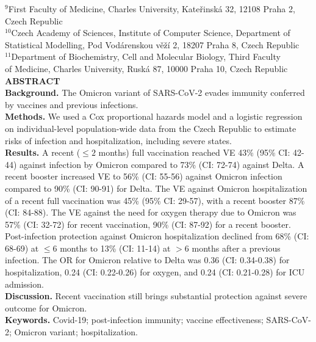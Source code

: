 \documentclass[a4paper,12pt]{article}
\begin{document}
$^9$First Faculty of Medicine, Charles University, Kate\v{r}inská 32, 12108 Praha 2, Czech Republic \\[1ex]
$^{10}$Czech Academy of Sciences, Institute of Computer Science, Department of Statistical Modelling, Pod Vodárenskou věží 2, 18207 Praha 8, Czech Republic \\[1ex]
$^{11}$Department of Biochemistry, Cell and Molecular Biology, Third Faculty \\ of Medicine, Charles University, Ruská 87, 10000 Praha 10, Czech Republic \\[3ex]
\noindent
\vspace{1ex}
\noindent
{\bf ABSTRACT} \\[1ex]
{\bf Background.} The Omicron variant of SARS-CoV-2 evades immunity conferred by vaccines and previous infections. \\
{\bf Methods.} We used a Cox proportional hazards model and a logistic regression on individual-level population-wide data from the Czech Republic to estimate risks of infection and hospitalization, including severe states.\\
{\bf Results.} A recent ($\leq 2$ months) full vaccination reached VE 43\% (95\% CI: 42-44) against infection by Omicron compared to 73\% (CI: 72-74) against Delta. A recent booster increased VE to 56\% (CI: 55-56) against Omicron infection compared to 90\% (CI: 90-91) for Delta. The VE against Omicron hospitalization of a recent full vaccination was 45\% (95\% CI: 29-57), with a recent booster 87\% (CI: 84-88). The VE against the need for oxygen therapy due to Omicron was 57\% (CI: 32-72) for recent vaccination, 90\% (CI: 87-92) for a recent booster. Post-infection protection against Omicron hospitalization declined from 68\% (CI: 68-69) at $\leq 6$ months to 13\% (CI: 11-14) at $>6$ months after a previous infection. The OR for Omicron relative to Delta was 0.36 (CI: 0.34-0.38) for hospitalization, 0.24 (CI: 0.22-0.26) for oxygen, and 0.24 (CI: 0.21-0.28) for ICU admission.\\
{\bf Discussion.} Recent vaccination still brings substantial protection against severe outcome for Omicron.
\\[1ex]
{\bf Keywords.} Covid-19; post-infection immunity; vaccine effectiveness; SARS-CoV-2; Omicron variant; hospitalization. \\[1ex]
\end{document}
